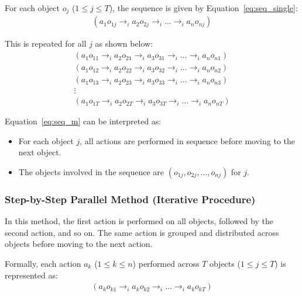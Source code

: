 \documentclass[a4paper,11pt]{lmcs}
\begin{document}
For each object \(o_j\) (\(1 \leq j \leq T\)), the sequence is given by Equation~\ref{eq:seq_single}:
\begin{eqnarray}
\label{eq:seq_single}
(a_1 o_{1j} \rightarrow_i a_2 o_{2j} \rightarrow_i \ldots \rightarrow_i a_n o_{nj})
\end{eqnarray}

This is repeated for all \(j\) as shown below:
\begin{eqnarray}
\label{eq:seq_m}
(a_1 o_{11} \rightarrow_i a_2 o_{21} \rightarrow_i a_3 o_{31} \rightarrow_i \ldots \rightarrow_i a_n o_{n1}) \\
(a_1 o_{12} \rightarrow_i a_2 o_{22} \rightarrow_i a_3 o_{32} \rightarrow_i \ldots \rightarrow_i a_n o_{n2}) \nonumber \\
(a_1 o_{13} \rightarrow_i a_2 o_{23} \rightarrow_i a_3 o_{33} \rightarrow_i \ldots \rightarrow_i a_n o_{n3}) \nonumber \\
\vdots \nonumber \\
(a_1 o_{1T} \rightarrow_i a_2 o_{2T} \rightarrow_i a_3 o_{3T} \rightarrow_i \ldots \rightarrow_i a_n o_{nT}) \nonumber
\end{eqnarray}

Equation~\ref{eq:seq_m} can be interpreted as:
\begin{itemize}
    \item For each object \(j\), all actions are performed in sequence before moving to the next object.
    \item The objects involved in the sequence are \((o_{1j}, o_{2j}, \ldots, o_{nj})\) for \(j\).
\end{itemize}

\subsubsection{Step-by-Step Parallel Method (Iterative Procedure)}
In this method, the first action is performed on all objects, followed by the second action, and so on. The same action is grouped and distributed across objects before moving to the next action.

Formally, each action \(a_k\) (\(1 \leq k \leq n\)) performed across \(T\) objects (\(1 \leq j \leq T\)) is represented as:
\begin{eqnarray}
\label{eq:parallel_single}
(a_k o_{k1} \rightarrow_i a_k o_{k2} \rightarrow_i \ldots \rightarrow_i a_k o_{kT})
\end{eqnarray}
\end{document}
